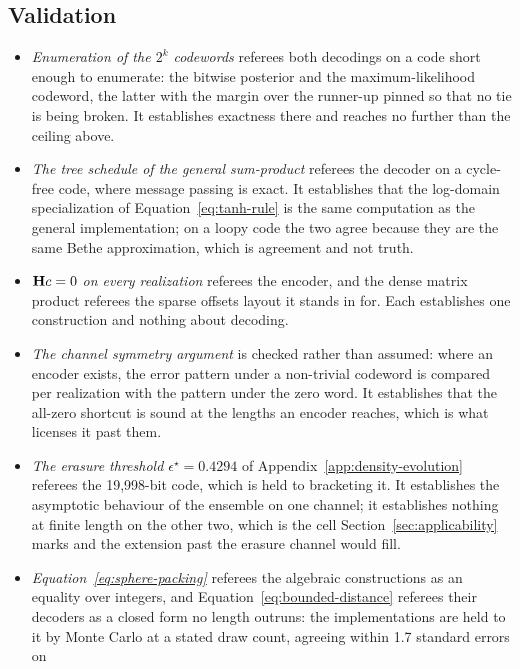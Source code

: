\documentclass[11pt,a4paper]{article}
\begin{document}
\subsection{Validation}
\label{sec:ldpc:validation}
\begin{itemize}
  \item \emph{Enumeration of the $2^{k}$ codewords} referees both decodings
    on a code short enough to enumerate: the bitwise posterior and the
    maximum-likelihood codeword, the latter with the margin over the runner-up
    pinned so that no tie is being broken. It establishes exactness there and
    reaches no further than the ceiling above.
  \item \emph{The tree schedule of the general sum-product} referees the
    decoder on a cycle-free code, where message passing is exact. It
    establishes that the log-domain specialization of
    Equation~\ref{eq:tanh-rule} is the same computation as the general
    implementation; on a loopy code the two agree because they are the same
    Bethe approximation, which is agreement and not truth.
  \item \emph{$\mathbf{H} c = 0$ on every realization} referees the encoder, and
    the dense matrix product referees the sparse offsets layout it stands in
    for. Each establishes one construction and nothing about decoding.
  \item \emph{The channel symmetry argument} is checked rather than assumed:
    where an encoder exists, the error pattern under a non-trivial codeword is
    compared per realization with the pattern under the zero word. It
    establishes that the all-zero shortcut is sound at the lengths an encoder
    reaches, which is what licenses it past them.
  \item \emph{The erasure threshold $\epsilon^{\star} = 0.4294$} of
    Appendix~\ref{app:density-evolution} referees the 19,998-bit code, which
    is held to bracketing it. It establishes the asymptotic behaviour of the
    ensemble on one channel; it establishes nothing at finite length on the
    other two, which is the cell Section~\ref{sec:applicability} marks and the
    extension past the erasure channel would fill.
  \item \emph{Equation~\ref{eq:sphere-packing}} referees the algebraic
    constructions as an equality over integers, and
    Equation~\ref{eq:bounded-distance} referees their decoders as a closed
    form no length outruns: the implementations are held to it by Monte
    Carlo at a stated draw count, agreeing within 1.7 standard errors on

\end{itemize}
\end{document}

